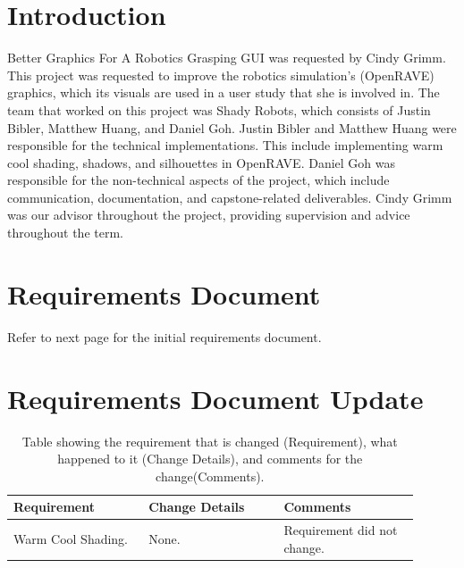 \documentclass[10pt,journal,compsoc,draftclsnofoot]{IEEEtran}
\begin{document}
\begin{flushleft}

\tableofcontents

\newpage

\section{Introduction}
Better Graphics For A Robotics Grasping GUI was requested by Cindy Grimm.
This project was requested to improve the robotics simulation's (OpenRAVE) graphics, which its visuals are used in a user study that she is involved in.
The team that worked on this project was Shady Robots, which consists of Justin Bibler, Matthew Huang, and Daniel Goh.
Justin Bibler and Matthew Huang were responsible for the technical implementations.
This include implementing warm cool shading, shadows, and silhouettes in OpenRAVE.
Daniel Goh was responsible for the non-technical aspects of the project, which include communication, documentation, and capstone-related deliverables.
Cindy Grimm was our advisor throughout the project, providing supervision and advice throughout the term. 
\newpage

\section{Requirements Document}

Refer to next page for the initial requirements document.

\newpage



\section{Requirements Document Update}

\begin{center}
\begin{table}[H]
\caption{Table showing the requirement that is changed (Requirement), what happened to it (Change Details), and comments for the change(Comments).}
\begin{tabular}{ | p{0.3\linewidth} | p{0.3\linewidth} | p{0.3\linewidth} | }
\hline
\textbf{Requirement}  & \textbf{Change Details}  & \textbf{Comments} \\ \hline

Warm Cool Shading. & 
None. & 
Requirement did not change. \\ \hline


\end{tabular}
\end{table}
\end{center}
\end{flushleft}
\end{document}
